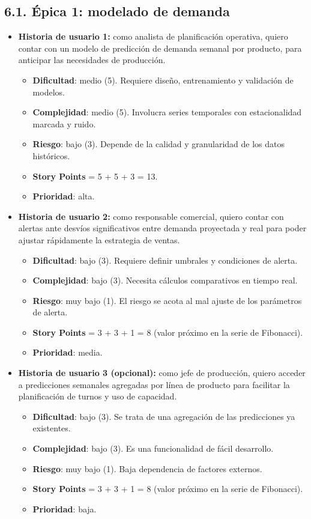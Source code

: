 \documentclass[
11pt, %
]{charter}
\begin{document}
\subsection*{6.1. Épica 1: modelado de demanda}
\begin{itemize}
  \item \textbf{Historia de usuario 1:} como analista de planificación operativa, quiero contar con un modelo de predicción de demanda semanal por producto, para anticipar las necesidades de producción.
    \begin{itemize}
      \item \textbf{Dificultad}: medio (5). Requiere diseño, entrenamiento y validación de modelos.
      \item \textbf{Complejidad}: medio (5). Involucra series temporales con estacionalidad marcada y ruido.
      \item \textbf{Riesgo}: bajo (3). Depende de la calidad y granularidad de los datos históricos.
      \item \textbf{Story Points} = 5 + 5 + 3 = 13.
      \item \textbf{Prioridad}: alta.
    \end{itemize}
  \item \textbf{Historia de usuario 2:} como responsable comercial, quiero contar con alertas ante desvíos significativos entre demanda proyectada y real para poder ajustar rápidamente la estrategia de ventas.
    \begin{itemize}
      \item \textbf{Dificultad}: bajo (3). Requiere definir umbrales y condiciones de alerta.
      \item \textbf{Complejidad}: bajo (3). Necesita cálculos comparativos en tiempo real.
      \item \textbf{Riesgo}: muy bajo (1). El riesgo se acota al mal ajuste de los parámetros de alerta.
      \item \textbf{Story Points} = 3 + 3 + 1 = 8 (valor próximo en la serie de Fibonacci).
      \item \textbf{Prioridad}: media.
    \end{itemize}
  \item \textbf{Historia de usuario 3 (opcional):} como jefe de producción, quiero acceder a predicciones semanales agregadas por línea de producto para facilitar la planificación de turnos y uso de capacidad.
    \begin{itemize}
      \item \textbf{Dificultad}: bajo (3). Se trata de una agregación de las predicciones ya existentes.
      \item \textbf{Complejidad}: bajo (3). Es una funcionalidad de fácil desarrollo.
      \item \textbf{Riesgo}: muy bajo (1). Baja dependencia de factores externos.
      \item \textbf{Story Points} = 3 + 3 + 1 = 8 (valor próximo en la serie de Fibonacci).
      \item \textbf{Prioridad}: baja.
    \end{itemize}
\end{itemize}
\end{document}
